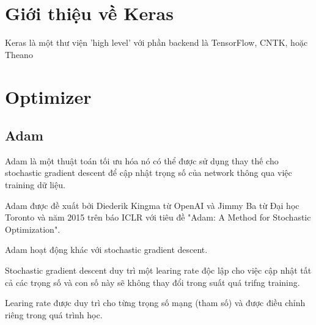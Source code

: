 \documentclass{article}
\begin{document}
    \section{Giới thiệu về Keras}
        Keras là một thư viện 'high level' với phần backend là TensorFlow, CNTK, hoặc Theano
    \section{Optimizer}
    \subsection{Adam}
    Adam là một thuật toán tối ưu hóa nó có thể được sử dụng thay thế cho stochastic gradient descent
    để cập nhật trọng số của network thông qua việc training dữ liệu.
    \par
    Adam được đề xuất bởi Diederik Kingma từ OpenAI và Jimmy Ba từ Đại học Toronto và năm
    2015 trên báo ICLR với tiêu đề "Adam: A Method for Stochastic Optimization".
    \par 
    Adam  hoạt động khác với stochastic gradient descent.
    \par
    Stochastic gradient descent duy trì một {\color{blue}learing rate} độc lập cho 
    việc cập nhật tất cả các trọng số và con số này sẽ không thay đổi trong suất quá trifng 
    training.
    \par
    {\color{blue}Learing rate} được duy trì cho từng trọng số mạng (tham số) và được điều chỉnh riêng trong quá trình học.
\end{document}
